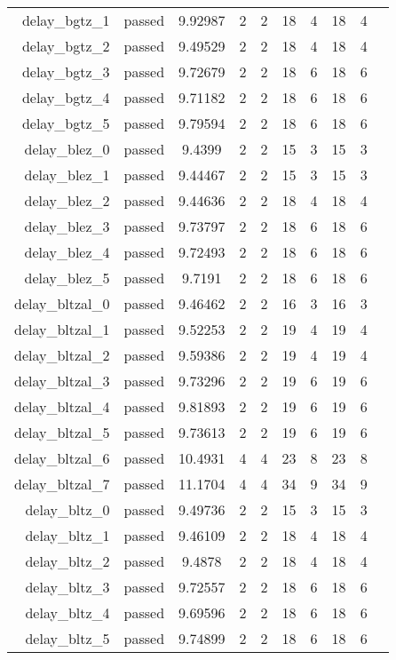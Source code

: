 \begin{longtable}{r|ccccccccc}
    delay\_bgtz\_1 & passed & 9.92987 & 2 & 2 & 18 & 4 & 18 & 4 \\
    delay\_bgtz\_2 & passed & 9.49529 & 2 & 2 & 18 & 4 & 18 & 4 \\
    delay\_bgtz\_3 & passed & 9.72679 & 2 & 2 & 18 & 6 & 18 & 6 \\
    delay\_bgtz\_4 & passed & 9.71182 & 2 & 2 & 18 & 6 & 18 & 6 \\
    delay\_bgtz\_5 & passed & 9.79594 & 2 & 2 & 18 & 6 & 18 & 6 \\
    delay\_blez\_0 & passed & 9.4399 & 2 & 2 & 15 & 3 & 15 & 3 \\
    delay\_blez\_1 & passed & 9.44467 & 2 & 2 & 15 & 3 & 15 & 3 \\
    delay\_blez\_2 & passed & 9.44636 & 2 & 2 & 18 & 4 & 18 & 4 \\
    delay\_blez\_3 & passed & 9.73797 & 2 & 2 & 18 & 6 & 18 & 6 \\
    delay\_blez\_4 & passed & 9.72493 & 2 & 2 & 18 & 6 & 18 & 6 \\
    delay\_blez\_5 & passed & 9.7191 & 2 & 2 & 18 & 6 & 18 & 6 \\
    delay\_bltzal\_0 & passed & 9.46462 & 2 & 2 & 16 & 3 & 16 & 3 \\
    delay\_bltzal\_1 & passed & 9.52253 & 2 & 2 & 19 & 4 & 19 & 4 \\
    delay\_bltzal\_2 & passed & 9.59386 & 2 & 2 & 19 & 4 & 19 & 4 \\
    delay\_bltzal\_3 & passed & 9.73296 & 2 & 2 & 19 & 6 & 19 & 6 \\
    delay\_bltzal\_4 & passed & 9.81893 & 2 & 2 & 19 & 6 & 19 & 6 \\
    delay\_bltzal\_5 & passed & 9.73613 & 2 & 2 & 19 & 6 & 19 & 6 \\
    delay\_bltzal\_6 & passed & 10.4931 & 4 & 4 & 23 & 8 & 23 & 8 \\
    delay\_bltzal\_7 & passed & 11.1704 & 4 & 4 & 34 & 9 & 34 & 9 \\
    delay\_bltz\_0 & passed & 9.49736 & 2 & 2 & 15 & 3 & 15 & 3 \\
    delay\_bltz\_1 & passed & 9.46109 & 2 & 2 & 18 & 4 & 18 & 4 \\
    delay\_bltz\_2 & passed & 9.4878 & 2 & 2 & 18 & 4 & 18 & 4 \\
    delay\_bltz\_3 & passed & 9.72557 & 2 & 2 & 18 & 6 & 18 & 6 \\
    delay\_bltz\_4 & passed & 9.69596 & 2 & 2 & 18 & 6 & 18 & 6 \\
    delay\_bltz\_5 & passed & 9.74899 & 2 & 2 & 18 & 6 & 18 & 6 \\

\end{longtable}
